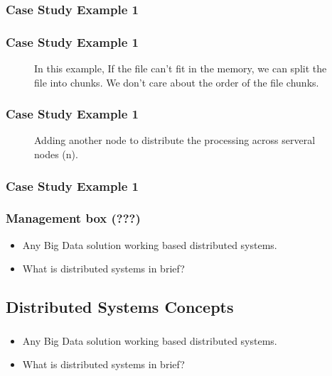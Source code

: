 \begin{frame}[plain,c]
	\frametitle{Case Study Example 1}

\end{frame}
\begin{frame}[plain,c]
	\frametitle{Case Study Example 1}
	\begin{figure}
		\centering
		
		\caption{In this example, If the file can't fit in the memory, we can split the file into chunks. We don't care about the order of the file chunks. } \label{fig:DS1}
	\end{figure}

\end{frame}
\begin{frame}[plain,c]
	\frametitle{Case Study Example 1}
		\begin{figure}
		\centering
	
			\caption{Adding another node to distribute the processing across serveral nodes (n). } \label{fig:DS2}
\end{figure}

\end{frame}
\begin{frame}[plain,c]
	\frametitle{Case Study Example 1}
	\begin{figure}
		\centering
		
	\end{figure}
	
\end{frame}

\begin{frame}
	\frametitle{Management box (???)}
	\begin{itemize} 
		\item Any Big Data solution working based distributed systems.
		\item What is distributed systems in brief?
	\end{itemize}
\end{frame}

\subsection{Distributed Systems Concepts}
\begin{frame}
\frametitle{\subsecname}
\begin{itemize} 
	\item Any Big Data solution working based distributed systems.
	\item What is distributed systems in brief?
\end{itemize}
\end{frame}


